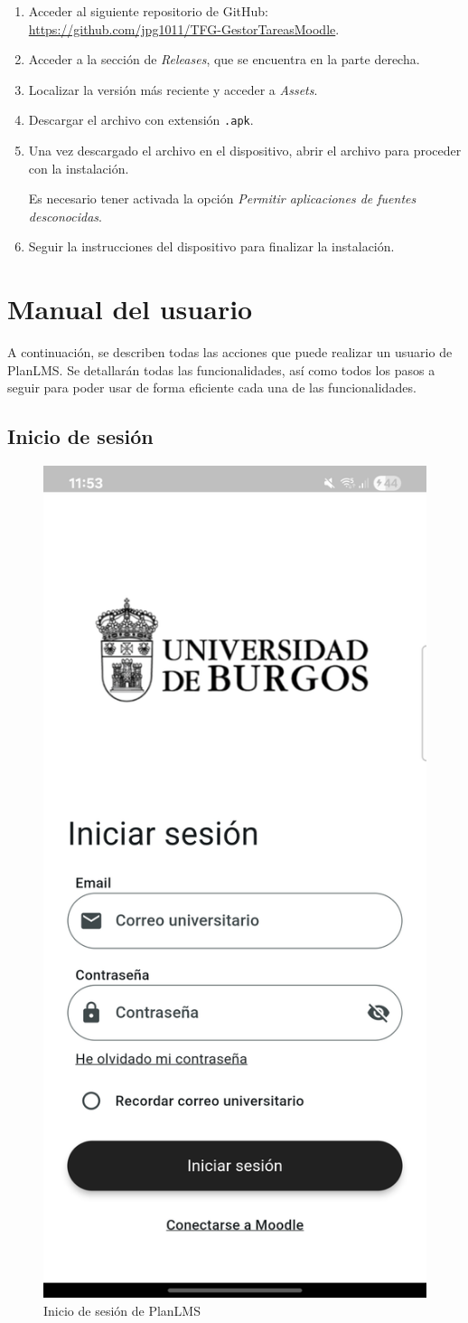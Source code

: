 \begin{enumerate}
    \item Acceder al siguiente repositorio de GitHub: \url{https://github.com/jpg1011/TFG-GestorTareasMoodle}.
    \item Acceder a la sección de \textit{Releases}, que se encuentra en la parte derecha.
    \item Localizar la versión más reciente y acceder a \textit{Assets}.
    \item Descargar el archivo con extensión \texttt{.apk}.
    \item Una vez descargado el archivo en el dispositivo, abrir el archivo para proceder con la instalación.

    Es necesario tener activada la opción \textit{Permitir aplicaciones de fuentes desconocidas}.
    \item Seguir la instrucciones del dispositivo para finalizar la instalación.
\end{enumerate}

\section{Manual del usuario}
A continuación, se describen todas las acciones que puede realizar un usuario de PlanLMS. Se detallarán todas las funcionalidades, así como todos los pasos a seguir para poder usar de forma eficiente cada una de las funcionalidades.

\subsection{Inicio de sesión}
\begin{figure}[H]
    \centering
    \includegraphics[width=0.4\linewidth]{img/inicio_sesion.jpg}
    \caption{Inicio de sesión de PlanLMS}
    \label{fig:inicio_sesion}
\end{figure}

